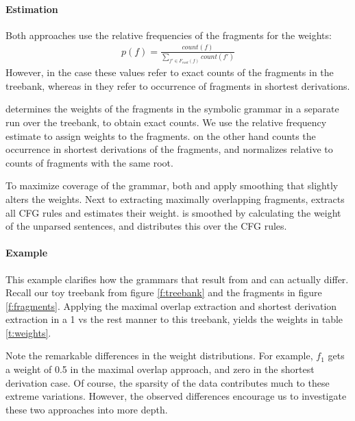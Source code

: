 \paragraph{Estimation}

Both approaches use the relative frequencies of the fragments for the weights:
\begin{align}p(f)=\frac{count(f)}{\sum_{f'\in F_{root}(f)} count(f')}\end{align} 
However, in the \ddop{} case these values refer to exact counts of the fragments in the treebank, whereas in \dops{} they refer to occurrence of fragments in shortest derivations.


\ddop{} determines the weights of the fragments in the symbolic grammar in a separate run over the treebank, to obtain exact counts. We use the relative frequency estimate to assign weights to the fragments. \dops{} on the other hand counts the occurrence in shortest derivations of the fragments, and normalizes relative to counts of fragments with the same root.

To maximize coverage of the grammar, both \ddop{} and \dops{} apply smoothing that slightly alters the weights. Next to extracting maximally overlapping fragments, \ddop{} extracts all CFG rules and estimates their weight. \dops{} is smoothed by calculating the weight of the unparsed sentences, and distributes this over the CFG rules.





\paragraph{Example}
\FloatBarrier
This example clarifies how the grammars that result from \ddop{} and \dops{} can actually differ. Recall our toy treebank from figure \ref{f:treebank} and the fragments in figure \ref{f:fragments}. 
Applying the maximal overlap extraction and shortest derivation extraction in a 1 vs the rest manner to this treebank, yields the weights in table \ref{t:weights}.

Note the remarkable differences in the weight distributions. For example, $f_1$ gets a weight of 0.5 in the maximal overlap approach, and zero in the shortest derivation case. Of course, the sparsity of the data contributes much to these extreme variations. However, the observed differences encourage us to investigate these two approaches into more depth.



